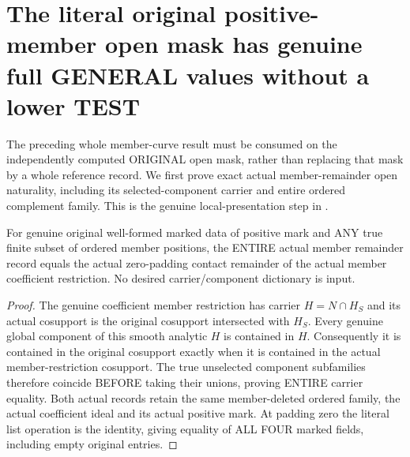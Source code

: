 \section{The literal original positive-member open mask has genuine full GENERAL values without a lower TEST}

The preceding whole member-curve result must be consumed on the independently
computed ORIGINAL open mask, rather than replacing that mask by a whole
reference record. We first prove exact actual member-remainder open naturality,
including its selected-component carrier and entire ordered complement family.
This is the genuine local-presentation step in
\cite[Section~5, Step~I.A]{bierstone-milman08-functoriality}.

\begin{lemma}
\label{hir:original-member-remainder-actual-contact-remainder-zero}
\leanok
For genuine original well-formed marked data of positive mark and ANY true
finite subset of ordered member positions, the ENTIRE actual member remainder
record equals the actual zero-padding contact remainder of the actual member
coefficient restriction. No desired carrier/component dictionary is input.
\end{lemma}
\begin{proof}
The genuine coefficient member restriction has carrier $H=N\cap H_S$ and its
actual cosupport is the original cosupport intersected with $H_S$.
Every genuine global component of this smooth analytic $H$ is contained in $H$.
Consequently it is contained in the original cosupport exactly when it is
contained in the actual member-restriction cosupport. The true unselected
component subfamilies therefore coincide BEFORE taking their unions, proving
ENTIRE carrier equality. Both actual records retain the same member-deleted
ordered family, the actual coefficient ideal and its actual positive mark.
At padding zero the literal list operation is the identity, giving equality
of ALL FOUR marked fields, including empty original entries.
\end{proof}

